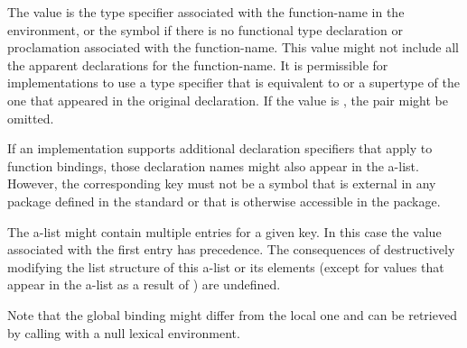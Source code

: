 \begin{defun}[Function]
\begin{indentdesc}{7pc}
\item[\cdf{ftype}]
The value is the type specifier associated with the function-name in the
                environment, or the symbol  if there is no functional
                type declaration or proclamation associated with the function-name.
                This value might not include all the apparent 
                declarations for the function-name.  It is permissible for
                implementations to use a type specifier that is equivalent
                to or a supertype of the one that appeared in the original
                declaration.  If the value is , the pair might be
                omitted. 
\end{indentdesc}
  If an implementation supports additional declaration specifiers that
  apply to function bindings, those declaration names might also
  appear in the a-list.  However, the corresponding key must not be
  a symbol that is external in any package defined in the standard or
  that is otherwise accessible in the  package.

  The a-list might contain multiple entries for a given key.
  In this case the value associated with the first entry has
  precedence.  The consequences of destructively modifying the list
  structure of this a-list or its elements (except for values
  that appear in the a-list as a result of ) are 
  undefined.

  Note that the global binding might differ from the local
  one and can be retrieved by calling  with a null
  lexical environment.
\end{defun}

